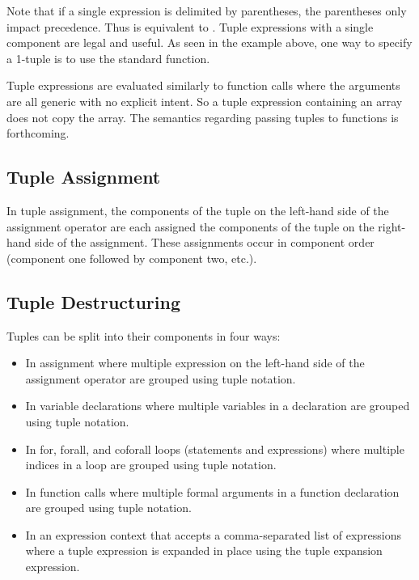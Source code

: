 Note that if a single expression is delimited by parentheses, the
parentheses only impact precedence.  Thus  is equivalent
to .  Tuple expressions with a single component are legal and
useful.  As seen in the example above, one way to specify a 1-tuple is
to use the standard  function.

Tuple expressions are evaluated similarly to function calls where the
arguments are all generic with no explicit intent.  So a tuple
expression containing an array does not copy the array.  The semantics
regarding passing tuples to functions is forthcoming.

\subsection{Tuple Assignment}
\label{Tuple_Assignment}

In tuple assignment, the components of the tuple on the left-hand side
of the assignment operator are each assigned the components of the
tuple on the right-hand side of the assignment.  These assignments
occur in component order (component one followed by component two,
etc.).

\subsection{Tuple Destructuring}
\label{Tuple_Destructuring}

Tuples can be split into their components in four ways:
\begin{itemize}
\item In assignment where multiple expression on the left-hand side of
the assignment operator are grouped using tuple notation.
\item In variable declarations where multiple variables in a
declaration are grouped using tuple notation.
\item In for, forall, and coforall loops (statements and expressions)
where multiple indices in a loop are grouped using tuple notation.
\item In function calls where multiple formal arguments in a function
declaration are grouped using tuple notation.
\item In an expression context that accepts a comma-separated list of
expressions where a tuple expression is expanded in place using the
tuple expansion expression.
\end{itemize}

